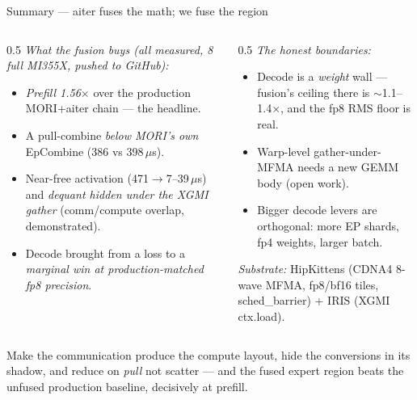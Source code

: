 \documentclass[pdf,aspectratio=169]{beamer}
\newcommand{\empy}[1]{{\color{darkorange}\emph{#1}}}
\newcommand{\empr}[1]{{\color{cardinalred}\emph{#1}}}
\newcommand{\examplebox}[2]{%
\begin{tcolorbox}[colframe=darkcardinal,colback=boxgray,title={#1}]
#2
\end{tcolorbox}}
\newcommand{\mc}[1]{{\ttfamily\small #1}}
\begin{document}
\begin{frame}{Summary --- aiter fuses the math; we fuse the region}
\footnotesize
\begin{columns}
\begin{column}{0.5\textwidth}
\empr{What the fusion buys (all measured, 8 full MI355X, pushed to GitHub):}
\begin{itemize}\footnotesize
  \item \empy{Prefill 1.56$\times$} over the production MORI+aiter chain --- the headline.
  \item A pull-combine \empy{below MORI's own} EpCombine (386 vs 398\,$\mu$s).
  \item Near-free activation (471$\to$7--39\,$\mu$s) and \empy{dequant hidden under the XGMI gather} (comm/compute overlap, demonstrated).
  \item Decode brought from a loss to a \empy{marginal win at production-matched fp8 precision}.
\end{itemize}
\end{column}
\begin{column}{0.5\textwidth}
\empr{The honest boundaries:}
\begin{itemize}\footnotesize
  \item Decode is a \emph{weight} wall --- fusion's ceiling there is $\sim$1.1--1.4$\times$, and the fp8 RMS floor is real.
  \item Warp-level gather-under-MFMA needs a new GEMM body (open work).
  \item Bigger decode levers are orthogonal: more EP shards, fp4 weights, larger batch.
\end{itemize}
\vspace{1ex}
\empr{Substrate:} HipKittens (CDNA4 8-wave MFMA, fp8/bf16 tiles, \mc{sched\_barrier}) + IRIS (XGMI \mc{ctx.load}).
\end{column}
\end{columns}
\vspace{0.5ex}
\examplebox{One line}{\footnotesize Make the communication produce the compute layout, hide the conversions in its shadow, and reduce on \emph{pull} not scatter --- and the fused expert region beats the unfused production baseline, decisively at prefill.}
\end{frame}
\end{document}
